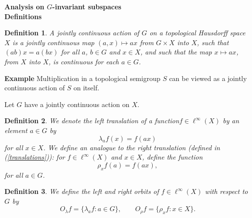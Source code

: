 \documentclass[landscape]{slides}
\newtheorem{defn}{Definition}
\begin{document}
\begin{slide}
{\large\bf{Analysis on $G$-invariant subspaces}}\\
{\bf Definitions}\\
\begin{defn}
A jointly continuous action of $G$ on a topological Hausdorff space $X$ is
a jointly continuous  map $(a,x) \mapsto ax$ from $G\times X$ into $X$, such that
$(ab)x = a(bx)$ for all $a$, $b\in G$ and $x\in X$, and such that the map 
$x\mapsto ax$, from $X$ 
into $X$, is continuous for each $a\in G$.
\end{defn}
{\bf Example} Multiplication in a topological semigroup $S$
can be viewed as a jointly continuous action of $S$ on itself.

\end{slide}

\begin{slide}
Let $G$ have a jointly continuous action on $X$.\\
\begin{defn}
We denote the left translation of a function\linebreak $f\in \ell^\infty (X)$ by an element $a\in G$ by
\[
\lambda_a f(x) = f(ax)
\]
for all $x\in X$.
We define an analogue to the right translation (defined
in (\ref{translations})): for $f\in \ell^\infty(X)$ and $x\in X$, define the function
\[
\rho_x f(a) = f(ax),
\]
for all $a\in G$.\\
\end{defn}
\begin{defn}
We define the left and right orbits of $f\in \ell^\infty(X)$ with respect to $G$ by
\[
O_\lambda f = \{ \lambda_a f: a\in G \},\qquad O_\rho f = \{ \rho_x f: x\in X \}.
\]
\end{defn}
\end{slide}
\end{document}

